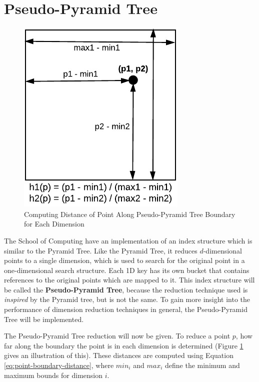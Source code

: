 \section{Pseudo-Pyramid Tree}

\begin{figure}
	\centering
	\includegraphics[scale=0.85]{figures/pseudo-pyramid_tree_point_boundary_distances.pdf}
	\caption{Computing Distance of Point Along Pseudo-Pyramid Tree Boundary for Each Dimension}
	\label{fig:point-boundary-distance}
\end{figure}

The School of Computing have an implementation of an index structure which is similar to the Pyramid Tree. Like the Pyramid Tree, it reduces $d$-dimensional points to a single dimension, which is used to search for the original point in a one-dimensional search structure. Each 1D key has its own bucket that contains references to the original points which are mapped to it. This index structure will be called the \textbf{Pseudo-Pyramid Tree}, because the reduction technique used is \textit{inspired} by the Pyramid tree, but is not the same.  To gain more insight into the performance of dimension reduction techniques in general, the Pseudo-Pyramid Tree will be implemented.

The Pseudo-Pyramid Tree reduction will now be given. To reduce a point $p$, how far along the boundary the point is in each dimension is determined (Figure \ref{fig:point-boundary-distance} gives an illustration of this). These distances are computed using Equation \ref{eq:point-boundary-distance}, where  $min_i$ and $max_i$ define the minimum and maximum bounds for dimension $i$.

